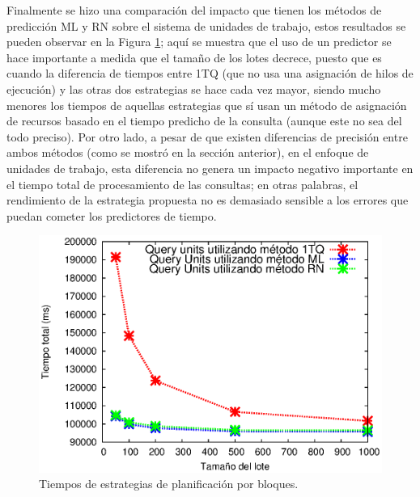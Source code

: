 Finalmente se hizo una comparación del impacto que tienen los métodos de predicción ML y RN sobre el sistema de unidades de trabajo, estos resultados se pueden observar en la Figura \ref{fig:gov2_bmw}; aquí se muestra que el uso de un predictor se hace importante a medida que el tamaño de los lotes decrece, puesto que es cuando la diferencia de tiempos entre 1TQ (que no usa una asignación de hilos de ejecución) y las otras dos estrategias se hace cada vez mayor, siendo mucho menores los tiempos de aquellas estrategias que sí usan un método de asignación de recursos basado en el tiempo predicho de la consulta (aunque este no sea del todo preciso). Por otro lado, a pesar de que existen diferencias de precisión entre ambos métodos (como se mostró en la sección anterior), en el enfoque de unidades de trabajo, esta diferencia no genera un impacto negativo importante en el tiempo total de procesamiento de las consultas; en otras palabras, el rendimiento de la estrategia propuesta no es demasiado sensible a los errores que puedan cometer los predictores de tiempo.

\begin{figure}[tp]
\centering
\includegraphics[scale=.75]{images/gov2_bmw.eps}
\caption{Tiempos de estrategias de planificación por bloques.}
\label{fig:gov2_bmw}
\end{figure}
